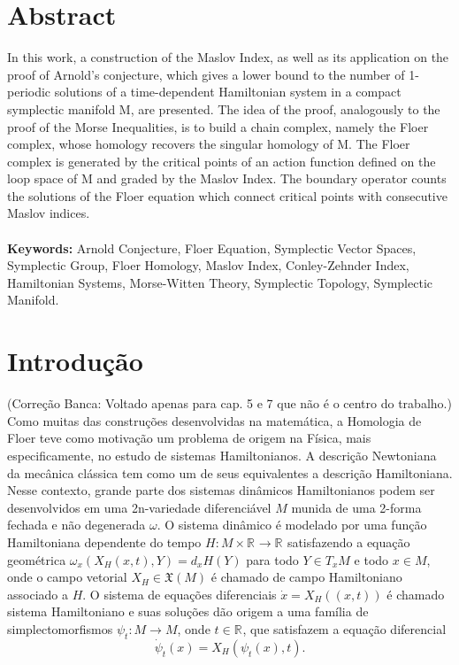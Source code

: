 \documentclass[12pt]{book}
\newcommand{\campohamiltoniano}[1]{X_{H}(#1)}
\newcommand{\campohamiltonianoabrev}{X_{H}}
\newcommand{\campossuaves}[1]{\mathfrak{X}(#1)}
\newcommand{\espacotangenteponto}[2]{T_{#1}#2}
\newcommand{\real}[1]{\mathbb{R}^{#1}}
\newcommand{\reta}{\real{}}
\newcommand{\alerta}[1]{{\color{red}#1}}
\newcommand{\correcaobanca}[1]{\alerta{(Correção Banca: #1)}}
\begin{document}
	\chapter*{Abstract}
	In this work, a construction of the Maslov Index, as well as its application on the proof of Arnold's conjecture, which gives a lower bound to the number of 1-periodic solutions of a time-dependent Hamiltonian  system in a compact symplectic manifold M, are presented. The idea of the proof, analogously to the proof of the Morse Inequalities, is to build a chain complex, namely the Floer complex, whose homology recovers the singular homology of M. The Floer complex is generated by the critical points of  an action function defined on the loop space of M and graded by the Maslov Index. The boundary operator counts the solutions of the Floer equation which connect critical points with consecutive Maslov indices.
	\\
	\\
	\textbf{Keywords:}  Arnold Conjecture, Floer Equation, Symplectic Vector Spaces, Symplectic Group, Floer Homology, Maslov Index, Conley-Zehnder Index, Hamiltonian Systems, Morse-Witten Theory, Symplectic Topology, Symplectic  Manifold.
	
	\chapter*{Introdução}\label{capitulo_introducao}
	\correcaobanca{Voltado apenas para cap. 5 e 7 que não é o centro do trabalho.}
	Como muitas das construções desenvolvidas na matemática, a Homologia de Floer teve como motivação um problema de origem na Física, mais especificamente, no estudo de sistemas Hamiltonianos. A descrição Newtoniana da mecânica clássica tem como um de seus equivalentes a descrição Hamiltoniana. Nesse contexto, grande parte dos sistemas dinâmicos Hamiltonianos podem ser desenvolvidos em uma 2n-variedade diferenciável $M$ munida de uma 2-forma fechada e não degenerada $\omega$. O sistema dinâmico é modelado por uma função Hamiltoniana dependente do tempo $H: M\times \reta\to \reta$ satisfazendo a equação geométrica $\omega_{x}(\campohamiltonianoabrev(x,t), Y) = d_{x}H(Y)$ para todo $Y \in \espacotangenteponto{x}{M}$ e todo $x \in M$, onde o campo vetorial $\campohamiltonianoabrev \in \campossuaves{M}$ é chamado de campo Hamiltoniano associado a $H$. O sistema de equações diferenciais $\dot{x} = \campohamiltoniano{(x,t)}$ é chamado sistema Hamiltoniano e suas soluções dão origem a uma família de simplectomorfismos $\psi_{t}:M\to M$, onde $t\in \reta$, que satisfazem a equação diferencial
	$$
	\dot{\psi}_{t}(x) = \campohamiltoniano{\psi_{t}(x),t}.
	$$
	
\end{document}
